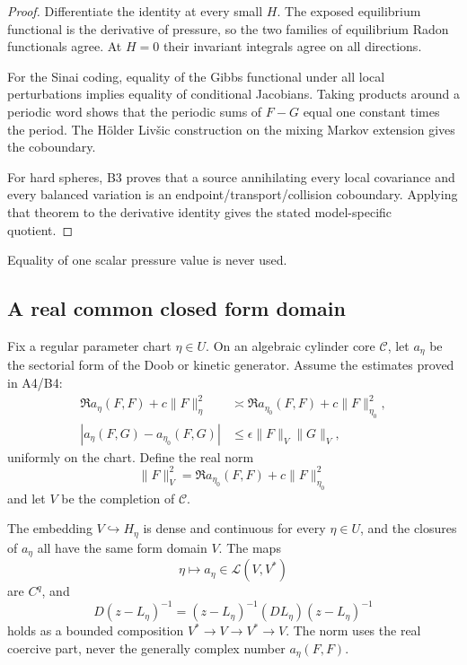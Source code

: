 \begin{proof}
Differentiate the identity at every small \(H\).  The exposed equilibrium
functional is the derivative of pressure, so the two families of equilibrium
Radon functionals agree.  At \(H=0\) their invariant integrals agree on all
directions.

For the Sinai coding, equality of the Gibbs functional under all local
perturbations implies equality of conditional Jacobians.  Taking products
around a periodic word shows that the periodic sums of \(F-G\) equal one
constant times the period.  The H\"older Liv\v{s}ic construction on the
mixing Markov extension gives the coboundary.

For hard spheres, B3 proves that a source annihilating every local covariance
and every balanced variation is an endpoint/transport/collision
coboundary.  Applying that theorem to the derivative identity gives the
stated model-specific quotient.
\end{proof}

Equality of one scalar pressure value is never used.

\subsection{A real common closed form domain}

Fix a regular parameter chart \(\eta\in U\).  On an algebraic cylinder core
\(\mathcal C\), let \(a_\eta\) be the sectorial form of the Doob or kinetic
generator.  Assume the estimates proved in A4/B4:
\[
 \begin{aligned}
 \Re a_\eta(F,F)+c\|F\|_{\eta}^2
 &\asymp
 \Re a_{\eta_0}(F,F)+c\|F\|_{\eta_0}^2,\\
 |a_\eta(F,G)-a_{\eta_0}(F,G)|
 &\le\epsilon\|F\|_V\|G\|_V ,
 \end{aligned}
\]
uniformly on the chart.  Define the real norm
\[
 \|F\|_V^2=
 \Re a_{\eta_0}(F,F)+c\|F\|_{\eta_0}^2
\]
and let \(V\) be the completion of \(\mathcal C\).

\begin{theorem}
\label{thm:r14-c2-form}
The embedding \(V\hookrightarrow H_\eta\) is dense and continuous for every
\(\eta\in U\), and the closures of \(a_\eta\) all have the same form domain
\(V\).  The maps
\[
 \eta\mapsto a_\eta\in\mathcal L(V,V^*)
\]
are \(C^q\), and
\[
 D(z-L_\eta)^{-1}
 =(z-L_\eta)^{-1}(DL_\eta)(z-L_\eta)^{-1}
\]
holds as a bounded composition
\(V^*\to V\to V^*\to V\).  The norm uses the real coercive part, never the
generally complex number \(a_\eta(F,F)\).
\end{theorem}

